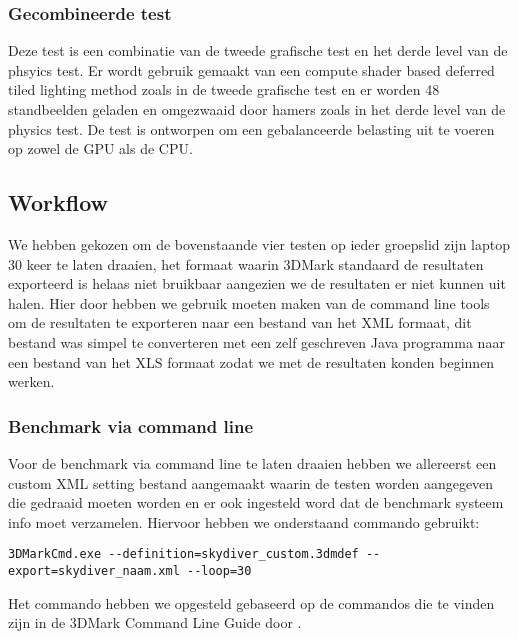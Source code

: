 
\subsubsection{Gecombineerde test}
Deze test is een combinatie van de tweede grafische test en het derde level van de phsyics test. Er wordt gebruik gemaakt van een compute shader based deferred tiled lighting method zoals in de tweede grafische test en er worden 48 standbeelden geladen en omgezwaaid door hamers zoals in het derde level van de physics test. De test is ontworpen om een gebalanceerde belasting uit te voeren op zowel de GPU als de CPU. \citep{3dmark_tech}


\subsection{Workflow}
We hebben gekozen om de bovenstaande vier testen op ieder groepslid zijn laptop 30 keer te laten draaien, het formaat waarin 3DMark standaard de resultaten exporteerd is helaas niet bruikbaar aangezien we de resultaten er niet kunnen uit halen. Hier door hebben we gebruik moeten maken van de command line tools om de resultaten te exporteren naar een bestand van het XML formaat, dit bestand was simpel te converteren met een zelf geschreven Java programma naar een bestand van het XLS formaat zodat we met de resultaten konden beginnen werken.

\subsubsection{Benchmark via command line}
Voor de benchmark via command line te laten draaien hebben we allereerst een custom XML setting bestand aangemaakt waarin de testen worden aangegeven die gedraaid moeten worden en er ook ingesteld word dat de benchmark systeem info moet verzamelen. Hiervoor hebben we onderstaand commando gebruikt:
\begin{lstlisting}
3DMarkCmd.exe --definition=skydiver_custom.3dmdef --export=skydiver_naam.xml --loop=30
\end{lstlisting}
Het commando hebben we opgesteld gebaseerd op de commandos die te vinden zijn in de 3DMark Command Line Guide door \cite{3dmark_cmd}. 
